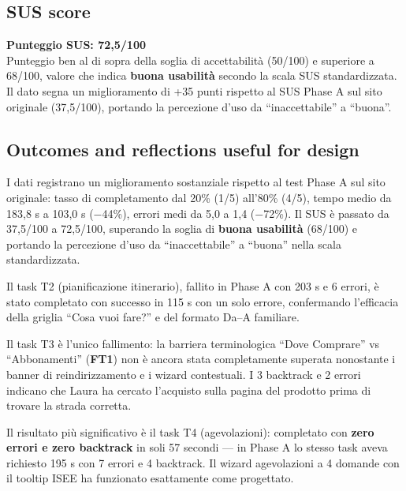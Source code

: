 ﻿\documentclass[11pt,a4paper]{article}
\begin{document}
\subsection*{SUS score}
\begin{tcolorbox}[base]
\textbf{Punteggio SUS: 72,5/100}\\[0.2cm]
\small Punteggio ben al di sopra della soglia di accettabilità
(50/100) e superiore a 68/100, valore che indica \textbf{buona
usabilità} secondo la scala SUS standardizzata. Il dato segna
un miglioramento di +35 punti rispetto al SUS Phase A sul sito
originale (37,5/100), portando la percezione d'uso da
``inaccettabile'' a ``buona''.
\end{tcolorbox}

\subsection*{Outcomes and reflections useful for design}
\begin{tcolorbox}[base]
I dati registrano un miglioramento sostanziale rispetto al test
Phase A sul sito originale: tasso di completamento dal 20\%
(1/5) all'80\% (4/5), tempo medio da 183,8 s a 103,0 s
($-$44\%), errori medi da 5,0 a 1,4 ($-$72\%). Il SUS è
passato da 37,5/100 a 72,5/100, superando la soglia di
\textbf{buona usabilità} (68/100) e portando la percezione
d'uso da ``inaccettabile'' a ``buona'' nella scala
standardizzata.

\medskip

Il task T2 (pianificazione itinerario), fallito in Phase A con
203 s e 6 errori, è stato completato con successo in 115 s con
un solo errore, confermando l'efficacia della griglia
``Cosa vuoi fare?'' e del formato Da--A familiare.

\medskip

Il task T3 è l'unico fallimento: la barriera terminologica
``Dove Comprare'' vs ``Abbonamenti'' (\textbf{FT1}) non è
ancora stata completamente superata nonostante i banner di
reindirizzamento e i wizard contestuali. I 3 backtrack e 2 errori
indicano che Laura ha cercato l'acquisto sulla pagina del
prodotto prima di trovare la strada corretta.

\medskip

Il risultato più significativo è il task T4 (agevolazioni):
completato con \textbf{zero errori e zero backtrack} in soli
57 secondi --- in Phase A lo stesso task aveva richiesto 195 s
con 7 errori e 4 backtrack. Il wizard agevolazioni a 4 domande
con il tooltip ISEE ha funzionato esattamente come progettato.
\end{tcolorbox}
\end{document}
